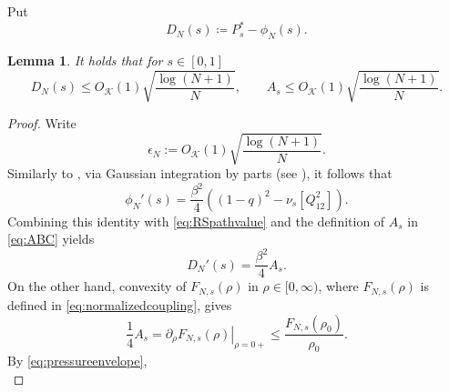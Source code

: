 \documentclass[11pt]{article}
\newtheorem{lemma}[theorem]{Lemma}
\numberwithin{equation}{section}
\newcommand{\E}{\mathbb{E}}
\newcommand{\1}{\mathbf 1}
\newcommand{\cK}{\mathcal K}
\newcommand{\braket}[1]{\left\langle #1\right\rangle}
\begin{document}
Put
\begin{equation}
 D_N(s)\coloneqq P_s^*-\phi_N(s).
 \label{eq:DN}
\end{equation}
\begin{lemma}
\label{lem:preconcentration}
It holds that for $s\in [0,1]$
\begin{equation}
 D_N(s)\le O_{\cK}(1) 
 \sqrt{\frac{\log(N+1)}N},
 \qquad
 A_s\le O_{\cK}(1) 
 \sqrt{\frac{\log(N+1)}N}.
 \label{eq:preconcentration}
\end{equation}
\end{lemma}
\begin{proof}
Write 
$$\epsilon_N:= O_{\cK}(1) 
 \sqrt{\frac{\log(N+1)}N}.$$
Similarly to \cite[(14)]{KusuokaNakajima1}, via Gaussian integration by parts (see \cite[Vol.~1,~Sec.~A.4]{Talagrand}), it follows that
\begin{equation}\label{eq:p-derivative}
\phi_N'(s)
=\frac{\beta^2}{4}\left(
(1-q)^2
-
\nu_s[Q_{12}^2]\right).
\end{equation}
Combining this identity with \eqref{eq:RSpathvalue} and the definition
of $A_s$ in \eqref{eq:ABC} yields
\begin{equation}
 D_N'(s)=\frac{\beta^2}{4}A_s. 
 \label{eq:DNprime}
\end{equation}
On the other hand, convexity of $F_{N,s}(\rho)$ in $\rho \in [0,\infty)$, where $F_{N,s}(\rho)$ is defined in \eqref{eq:normalizedcoupling}, gives
\begin{equation}\label{eq:lemreconcentration1}
   \frac14A_s
 =\left.\partial_\rho F_{N,s}(\rho)\right|_{\rho=0+}
 \le\frac{F_{N,s}(\rho_0)}{\rho_0}.  
\end{equation}
By \eqref{eq:pressureenvelope},
\begin{equation}\label{eq:lemreconcentration2}

\end{equation}
\end{proof}
\end{document}
